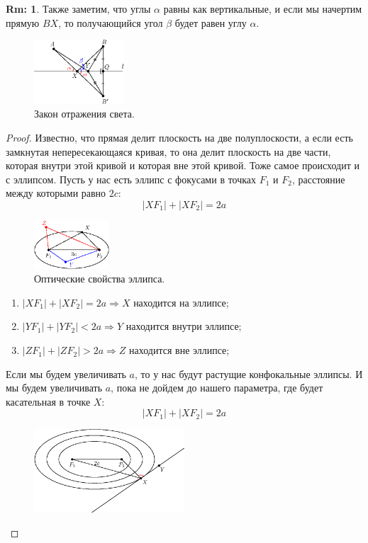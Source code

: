 \documentclass[12pt]{article}
\theoremstyle{definition}
\newtheorem{rem}{Rm:}
\begin{document}
\begin{rem}
	Также заметим, что углы $\alpha$ равны как вертикальные, и если мы начертим прямую $BX$, то получающийся угол $\beta$ будет равен углу $\alpha$.
	\begin{figure}[H]
		\centering
		\includegraphics[width=0.3\textwidth]{ANGL2_7.eps}
		\caption{Закон отражения света.}
		\label{2_7}
	\end{figure}
\end{rem}

\begin{proof}
	Известно, что прямая делит плоскость на две полуплоскости, а если есть замкнутая непересекающаяся кривая, то она делит плоскость на две части, которая внутри этой кривой и которая вне этой кривой. Тоже самое происходит и с эллипсом. Пусть у нас есть эллипс с фокусами в точках $F_1$ и $F_2$, расстояние между которыми равно $2c$:
	$$
		|XF_1| + |XF_2| = 2a
	$$
	\begin{figure}[H]
		\centering
		\includegraphics[width=0.25\textwidth]{ANGL2_8.eps}
		\caption{Оптические свойства эллипса.}
		\label{2_8}
	\end{figure}
	\begin{enumerate}[label=(\arabic*)]
		\item $|XF_1| + |XF_2| = 2a \Rightarrow X$ находится на эллипсе;
		\item $|YF_1| + |YF_2| < 2a \Rightarrow Y$ находится внутри эллипсе;
		\item $|ZF_1| + |ZF_2| > 2a \Rightarrow Z$ находится вне эллипсе;
	\end{enumerate}
	Если мы будем увеличивать $a$, то у нас будут растущие конфокальные эллипсы. И мы будем увеличивать $a$, пока не дойдем до нашего параметра, где будет касательная в точке $X$:
	$$
		|XF_1| + |XF_2| = 2a
	$$
	\begin{figure}[H]
		\centering
		\includegraphics[width=0.5\textwidth]{ANGL2_9.eps}

\end{figure}
\end{proof}
\end{document}
